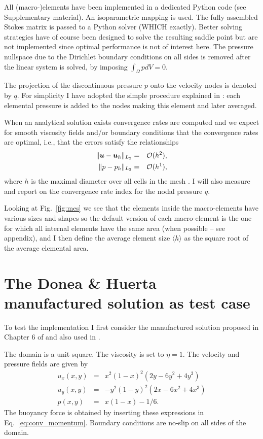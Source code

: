 \documentclass[a4paper]{article}
\begin{document}
All (macro-)elements have been implemented in a dedicated Python code (see Supplementary material). 
An isoparametric mapping is used. 
The fully assembled Stokes matrix is passed to a Python solver (WHICH exactly). 
Better solving strategies have of course 
been designed to solve the resulting saddle point \cite{begl05} but are not 
implemented since optimal performance is not of interest here.
The pressure nullspace due to the Dirichlet boundary conditions on all sides is removed 
after the linear system is solved, by imposing $\int_\Omega p dV= 0$.

The projection of the discontinuous pressure $p$ onto the velocity nodes is denoted by $q$. 
For simplicity I have adopted the simple procedure explained in \cite{REF}: each 
elemental pressure is added to the nodes making this element and later averaged. 

When an analytical solution exists convergence rates are computed and 
we expect for smooth viscosity fields and/or boundary conditions that the convergence rates 
are optimal, i.e., that the errors satisfy the relationships
\begin{eqnarray}
\| {\bm u} - {\bm u}_h \|_{L_2} &=&  {\cal O}(h^{2}),     \\  
\| p - p_h \|_{L_2}   &=& {\cal O}(h^{1}),
  \label{eq:error-rates}
\end{eqnarray}
where $h$ is the maximal diameter over all cells in the mesh \cite{thba22,thba25}.
I will also measure and report on the convergence rate index for the nodal pressure $q$.

Looking at Fig.~\ref{fig:mes} we see that the elements inside the macro-elements 
have various sizes and shapes so 
the default version of each macro-element is the one for which all internal elements have the same area
(when possible -- see appendix), and I then define the average element size
$\langle h \rangle$ as the square root of the average elemental area.


\section{The Donea \& Huerta manufactured solution as test case}

To test the implementation I first consider the manufactured solution 
proposed in Chapter 6 of \cite{dohu03} and also used in \cite{thba22,thba25}.
 
The domain is a unit square. The viscosity is set to $\eta=1$.
The velocity and pressure fields are given by
\begin{eqnarray}
u_x(x,y) &=& x^2(1- x)^2 (2y - 6y^2 + 4y^3)  \\
u_y(x,y) &=& -y^2 (1 - y)^2 (2x - 6x^2 + 4x^3) \\
p(x,y) &=& x(1 -x)- 1/6. 
\end{eqnarray}
The buoyancy force is obtained by inserting these expressions
in Eq.~\ref{eq:conv_momentum}.
Boundary conditions are no-slip on all sides of the domain.
\end{document}
